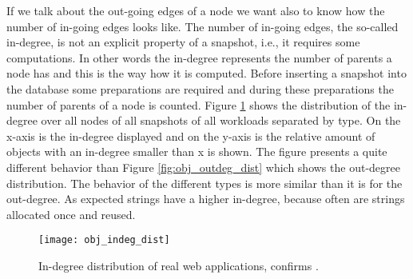 If we talk about the out-going edges of a node we want also to know how the number of in-going edges looks like. The number of in-going edges, the so-called in-degree, is not an explicit property of a snapshot, i.e., it requires some computations. In other words the in-degree represents the number of parents a node has and this is the way how it is computed. Before inserting a snapshot into the database some preparations are required and during these preparations the number of parents of a node is counted. Figure \ref{fig:obj_indeg_dist} shows the distribution of the in-degree over all nodes of all snapshots of all workloads separated by type. On the x-axis is the in-degree displayed and on the y-axis is the relative amount of objects with an in-degree smaller than x is shown. The figure presents a quite different behavior than Figure \ref{fig:obj_outdeg_dist} which shows the out-degree distribution. The behavior of the different types is more similar than it is for the out-degree. As expected strings have a higher in-degree, because often are strings allocated once and reused.
\begin{figure}
	\centering
	\texttt{[image: obj\_indeg\_dist]}
	\caption{In-degree distribution of real web applications, confirms \cite{JSMeter2009}.}
	\label{fig:obj_indeg_dist}
\end{figure}


